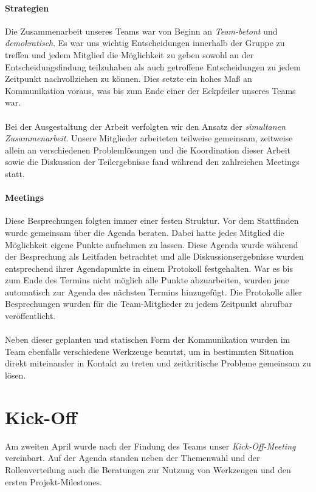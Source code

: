\paragraph{Strategien} Die Zusammenarbeit unseres Teams war von Beginn an \textit{Team-}\textit{betont} und \textit{demokratisch}. Es war uns wichtig Entscheidungen innerhalb der Gruppe zu treffen und jedem Mitglied die Möglichkeit zu geben sowohl an der Entscheidungsfindung teilzuhaben als auch getroffene Entscheidungen zu jedem Zeitpunkt nachvollziehen zu können. Dies setzte ein hohes Maß an Kommunikation voraus, was bis zum Ende einer der Eckpfeiler unseres Teams war.

\paragraph{}Bei der Ausgestaltung der Arbeit verfolgten wir den Ansatz der \textit{simultanen Zusammenarbeit}. Unsere Mitglieder arbeiteten teilweise gemeinsam, zeitweise allein an verschiedenen Problemlösungen und die Koordination dieser Arbeit sowie die Diskussion der Teilergebnisse fand während den zahlreichen Meetings statt.

\paragraph{Meetings}Diese Besprechungen folgten immer einer festen Struktur. Vor dem Statt\-finden wurde gemeinsam über die Agenda beraten. Dabei hatte jedes Mitglied die Möglichkeit eigene Punkte aufnehmen zu lassen. Diese Agenda wurde während der Besprechung als Leitfaden betrachtet und alle Diskussionsergebnisse wurden entsprechend ihrer Agendapunkte in einem Protokoll festgehalten. War es bis zum Ende des Termins nicht möglich alle Punkte abzuarbeiten, wurden jene automatisch zur Agenda des nächsten Termins hinzugefügt. Die Protokolle aller Besprechungen wurden für die Team-Mitglieder zu jedem Zeitpunkt abrufbar veröffentlicht.

\paragraph{}Neben dieser geplanten und statischen Form der Kommunikation wurden im Team ebenfalls verschiedene Werkzeuge benutzt, um in bestimmten Situation direkt miteinander in Kontakt zu treten und zeitkritische Probleme gemeinsam zu lösen.

\section{Kick-Off}
Am zweiten April wurde nach der Findung des Teams unser \textit{Kick-Off-Meeting} vereinbart. Auf der Agenda standen neben der Themenwahl und der Rollenverteilung auch die Beratungen zur Nutzung von Werkzeugen und den ersten Projekt-Milestones.

